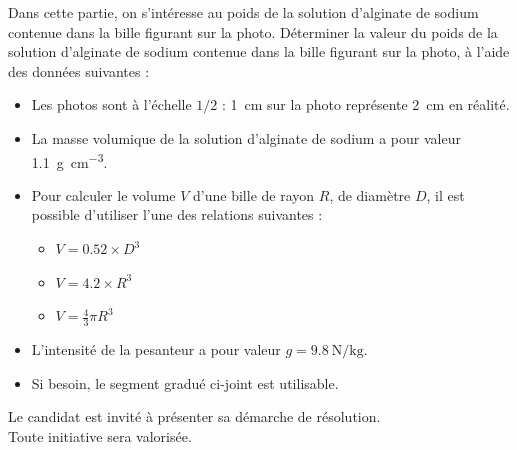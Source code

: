 \documentclass["../Cours.tex"]{subfiles}
\begin{document}
\clearpage
\EXERCICES 
\begin{questions}
        Dans cette partie, on s’intéresse au poids de la solution d’alginate de sodium contenue dans la bille figurant sur la photo. Déterminer la valeur du poids de la solution d’alginate de sodium contenue dans la bille figurant sur la photo, à l’aide des données suivantes :
        \begin{itemize}
            \item Les photos sont à l’échelle $1/2$ : \qty{1}{\centi\metre} sur la photo représente \qty{2}{\centi\metre} en réalité.   
            \item La masse volumique de la solution d’alginate de sodium a pour valeur \qty{1.1}{\gram\per\centi\metre\cubed}.
            \item Pour calculer le volume $V$ d’une bille de rayon $R$, de diamètre $D$, il est possible d’utiliser l’une des relations suivantes :
            \begin{itemize}
                \item $V=\num{0.52} \times D^3$
                \item $V=\num{4.2} \times R^3$
                \item $V=\frac{4}{3} \pi R^3 $
            \end{itemize}
            \item L’intensité de la pesanteur a pour valeur $g = \qty{9.8}{\newton\per\kilo\gram}$.
            \item Si besoin, le segment gradué ci-joint est utilisable.
        \end{itemize}
        Le candidat est invité à présenter sa démarche de résolution.\\ 
        Toute initiative sera valorisée.


\end{questions}
\end{document}
